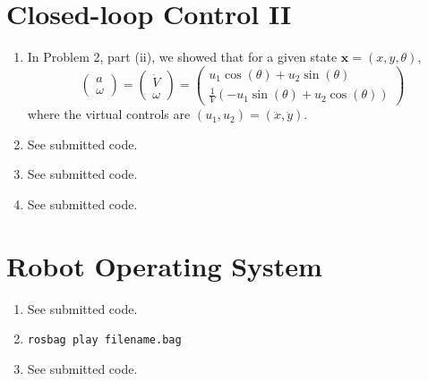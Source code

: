 \documentclass[12pt]{article}
\begin{document}
\section{Closed-loop Control II}
\begin{enumerate}
	\item In Problem 2, part (ii), we showed that for a given state $\mathbf{x} = (x,y,\theta)$,
	\[
		\left(\begin{array}{c}
		a \\
		\omega
		\end{array}\right) =
		\left(\begin{array}{c}
		\dot V \\
		\omega
		\end{array}\right) =
		\left(\begin{array}{c}
		u_1\cos(\theta) + u_2\sin(\theta) \\
		\frac{1}{V}(-u_1\sin(\theta) + u_2\cos(\theta))
		\end{array}\right)
	\]
	where the virtual controls are $(u_1,u_2) = (\ddot x, \ddot y)$.
	\item See submitted code.
	\item See submitted code.
	\item See submitted code.
\end{enumerate}

\section{Robot Operating System}
\begin{enumerate}
	\item See submitted code.
	\item \verb|rosbag play filename.bag|
	\item See submitted code.
\end{enumerate}
\end{document}
